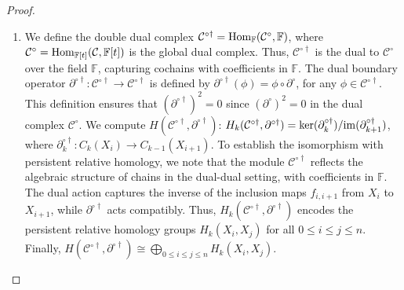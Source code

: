\begin{proof}
\begin{enumerate}
\item We define the double dual complex \( \mathcal{C}^{\circ\dagger} = {\mathrm{Hom}}_{\mathbb{F}}(\mathcal{C}^\circ, {\mathbb{F}}) \), where \( \mathcal{C}^\circ = {\mathrm{Hom}}_{\mathbb{F}[t]}(\mathcal{C}, \mathbb{F}[t]) \) is the global dual complex. Thus, \( \mathcal{C}^{\circ\dagger} \) is the dual to \( \mathcal{C}^\circ \) over the field \( \mathbb{F} \), capturing cochains with coefficients in \( \mathbb{F} \). The dual boundary operator \( \partial^{\circ\dagger}: \mathcal{C}^{\circ\dagger} \to \mathcal{C}^{\circ\dagger} \) is defined by $\partial^{\circ\dagger}(\phi) = \phi \circ \partial^\circ$, for any \( \phi \in \mathcal{C}^{\circ\dagger} \). This definition ensures that \( (\partial^{\circ\dagger})^2 = 0 \) since \( (\partial^\circ)^2 = 0 \) in the dual complex \( \mathcal{C}^\circ \). We compute \( H(\mathcal{C}^{\circ\dagger}, \partial^{\circ\dagger}) \): $H_k(\mathcal{C}^{\circ\dagger}, \partial^{\circ\dagger}) = \ker(\partial^{\circ\dagger}_k) / \mathrm{im}(\partial^{\circ\dagger}_{k+1})$, where \( \partial^{\circ\dagger}_k: C_k(X_i) \to C_{k-1}(X_{i+1}) \). To establish the isomorphism with persistent relative homology, we note that the module \( \mathcal{C}^{\circ\dagger} \) reflects the algebraic structure of chains in the dual-dual setting, with coefficients in \( \mathbb{F} \). The dual action captures the inverse of the inclusion maps \( f_{i,i+1} \) from \( X_i \) to \( X_{i+1} \), while \( \partial^{\circ\dagger} \) acts compatibly. Thus, \( H_k(\mathcal{C}^{\circ\dagger}, \partial^{\circ\dagger}) \) encodes the persistent relative homology groups \( H_k(X_i, X_j) \) for all \( 0 \leq i \leq j \leq n \). Finally, $H(\mathcal{C}^{\circ\dagger}, \partial^{\circ\dagger}) \cong \bigoplus_{0 \leq i \leq j \leq n} H_k(X_i, X_j)$.
\end{enumerate}
\end{proof}

